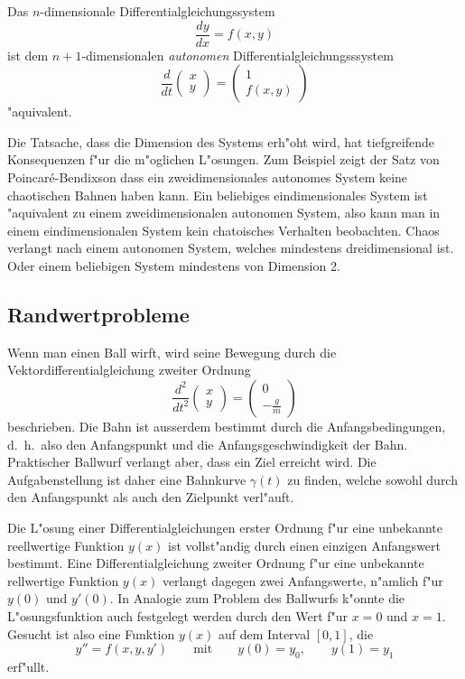 \begin{satz}
Das $n$-dimensionale Differentialgleichungssystem 
\[
\frac{dy}{dx}=f(x,y)
\]
ist dem $n+1$-dimensionalen {\em autonomen} Differentialgleichungsssystem
\[
\frac{d}{dt}
\begin{pmatrix}
x\\y
\end{pmatrix}
=
\begin{pmatrix}1\\f(x,y)\end{pmatrix}
\]
"aquivalent.
\end{satz}

Die Tatsache, dass die Dimension des Systems erh"oht wird, hat tiefgreifende
Konsequenzen f"ur die m"oglichen L"osungen.
Zum Beispiel zeigt der Satz von Poincar\'e-Bendixson dass ein zweidimensionales
autonomes System keine chaotischen Bahnen haben kann.
Ein beliebiges eindimensionales System ist "aquivalent zu einem
zweidimensionalen autonomen System, also kann man in einem eindimensionalen
System kein chatoisches Verhalten beobachten.
Chaos verlangt nach einem autonomen System, welches mindestens dreidimensional
ist.
Oder einem beliebigen System mindestens von Dimension 2.

\subsection{Randwertprobleme\label{section:randwertprobleme}}
Wenn man einen Ball wirft, wird seine Bewegung durch die
Vektordifferentialgleichung zweiter Ordnung
\[
\frac{d^2}{dt^2}\begin{pmatrix}x\\y\end{pmatrix}
=
\begin{pmatrix}0\\\displaystyle-\frac{g}{m}\end{pmatrix}
\]
beschrieben.
Die Bahn ist ausserdem bestimmt durch die Anfangsbedingungen,
d.~h.~also den Anfangspunkt und die Anfangsgeschwindigkeit der Bahn.
Praktischer Ballwurf verlangt aber, dass ein Ziel erreicht wird.
Die Aufgabenstellung ist daher eine Bahnkurve $\gamma(t)$ zu finden,
welche sowohl durch den Anfangspunkt als auch den Zielpunkt
verl"auft.

Die L"osung einer Differentialgleichungen erster Ordnung f"ur eine
unbekannte reellwertige Funktion $y(x)$ ist vollst"andig durch einen
einzigen Anfangswert bestimmt.
Eine Differentialgleichung zweiter Ordnung f"ur eine unbekannte
rellwertige Funktion $y(x)$ verlangt dagegen zwei Anfangswerte,
n"amlich f"ur $y(0)$ und $y'(0)$.
In Analogie zum Problem des Ballwurfs k"onnte die L"osungsfunktion auch
festgelegt werden durch den Wert f"ur $x=0$ und $x=1$.
Gesucht ist also eine Funktion $y(x)$ auf dem Interval $[0,1]$, die
\begin{equation}
y''=f(x,y,y')
\qquad\text{mit}\qquad
y(0)=y_0,
\qquad
y(1)=y_1
\end{equation}
erf"ullt.

